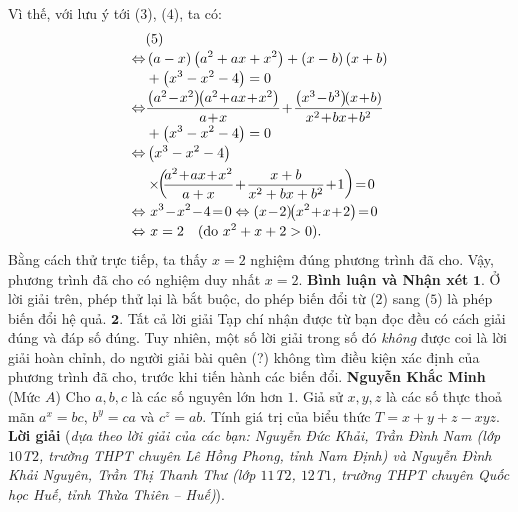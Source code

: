 \begin{multicols}{2}
\begin{align*}
	\end{align*}
	Vì thế, với lưu ý tới ($3$), ($4$), ta có:
	\begin{align*}
		&(5) \\[-0.5ex]
		\Leftrightarrow &\left( {a - x} \right)\left( {{a^2} + ax + {x^2}} \right) + \left( {x - b} \right)\left( {x + b} \right) \\[-0.5ex]
		&+ \left( {{x^3} - {x^2} - 4} \right) = 0\\[-0.5ex]
		\Leftrightarrow &\frac{{\left( {{a^2} \!-\! {x^2}} \right)\!\!\left( {{a^2} \!+\! ax \!+\! {x^2}} \right)}}{{a \!+\! x}} \!+\! \frac{{\left( {{x^3} \!-\! {b^3}} \right)\!\!\left( {x \!+\! b} \right)}}{{{x^2} \!+\! bx \!+\! {b^2}}} \\[-0.5ex]
		&+ \left( {{x^3} - {x^2} - 4} \right) = 0\\[-0.5ex]
		\Leftrightarrow &\left( {{x^3} - {x^2} - 4} \right)\\
		&\times\!\!\left(\!\! {\frac{{{a^2} \!+\! ax \!+\! {x^2}}}{{a + x}} \!+\! \frac{{x + b}}{{{x^2} + bx + {b^2}}} \!+\! 1} \right) \!=\! 0\\[-0.5ex]
		\Leftrightarrow &\,\,{x^3} \!-\! {x^2} \!-\! 4 \!=\! 0 \Leftrightarrow  \left( {x \!-\! 2} \right)\!\!\left( {{x^2} \!+\! x \!+\! 2} \right) \!=\! 0\\[-0.5ex]
		\Leftrightarrow &\,\,x = 2 \quad(\text{\color{black}do } x^2 + x + 2 > 0).
	\end{align*}
	Bằng cách thử trực tiếp, ta thấy $x = 2$ nghiệm đúng phương trình đã cho.
	\vskip 0.05cm
	Vậy, phương trình đã cho có nghiệm duy nhất $x = 2$.
	\vskip 0.05cm
	\textbf{\color{thachthuctoanhoc}Bình luận và Nhận xét}
	\vskip 0.05cm
	$\pmb{1.}$ Ở lời giải trên, phép thử lại là bắt buộc, do phép biến đổi từ ($2$) sang ($5$) là phép biến đổi hệ quả.
	\vskip 0.05cm
	$\pmb{2.}$ Tất cả lời giải Tạp chí nhận được từ bạn đọc đều có cách giải đúng và đáp số đúng. Tuy nhiên, một số lời giải trong số đó \textit{không} được coi là lời giải hoàn chỉnh, do người giải bài quên (?) không tìm điều kiện xác định của phương trình đã cho, trước khi tiến hành các biến đổi.
	\vskip 0.05cm
	\hfill	\textbf{\color{thachthuctoanhoc}Nguyễn Khắc Minh}
	\vskip 0.05cm
	{}
	(Mức $A$) Cho $a,b,c$ là các số nguyên lớn hơn $1$. Giả sử $x,y,z$ là các số thực thoả mãn $a^x=bc$, $b^y=ca$ và $c^z=ab$. Tính giá trị của biểu thức $T=x+y+z-xyz$. 
	\vskip 0.05cm
	\textbf{\color{thachthuctoanhoc}Lời giải} (\textit{dựa theo lời giải của các bạn: Nguyễn Đức Khải, Trần Đình Nam (lớp $10$T$2$, trường THPT chuyên Lê Hồng Phong, tỉnh Nam Định) và Nguyễn Đình Khải Nguyên, Trần Thị Thanh Thư (lớp $11$T$2$, $12$T$1$, trường THPT chuyên Quốc học Huế, tỉnh Thừa Thiên -- Huế)}).

\end{multicols}
